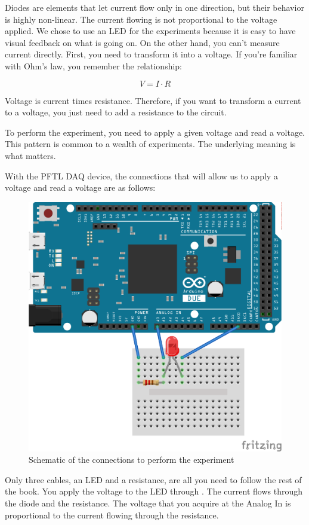Diodes are elements that let current flow only in one direction, but their behavior is highly non-linear. The current flowing is not proportional to the voltage applied. We chose to use an LED for the experiments because it is easy to have visual feedback on what is going on. On the other hand, you can't measure current directly. First, you need to transform it into a voltage. If you're familiar with Ohm's law, you remember the relationship:

\begin{equation}
V = I \cdot R
\end{equation}

Voltage is current times resistance. Therefore, if you want to transform a current to a voltage, you just need to add a resistance to the circuit.

To perform the experiment, you need to apply a given voltage and read a  voltage. This pattern is common to a wealth of experiments. The underlying meaning is what matters.

With the {PFTL DAQ} device, the connections that will allow us to apply a voltage and read a voltage are as follows:

\begin{figure}
\centering
\includegraphics[width=.5\textwidth]{images/Chapter_03/IV_scheme_bb.png}
\caption{Schematic of the connections to perform the experiment}
\end{figure}

Only three cables, an LED and a resistance, are all you need to follow the rest of the book. You apply the voltage to the LED through . The current flows through the diode and the resistance. The voltage that you acquire at the Analog In  is proportional to the current flowing through the resistance.


